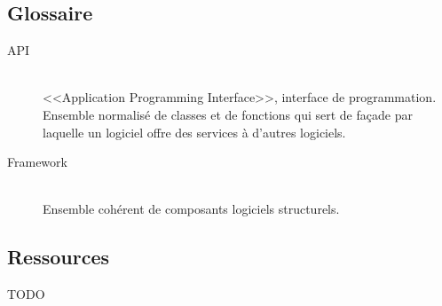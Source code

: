 \documentclass[a4paper,french,12pt]{article}
\begin{document}
		

	\newpage

	\subsection{Glossaire}
		\begin{description}

		\item [API]~\\
		    <<Application Programming Interface>>, interface de programmation. Ensemble normalisé de classes et de
		    fonctions qui sert de façade par laquelle un logiciel offre des services à d'autres logiciels.

		\item [Framework]~\\
		    Ensemble cohérent de composants logiciels structurels.
		\end{description}

	\subsection{Ressources}
	  \begin{description}
	 		  	\item TODO
	  \end{description}
\end{document}
